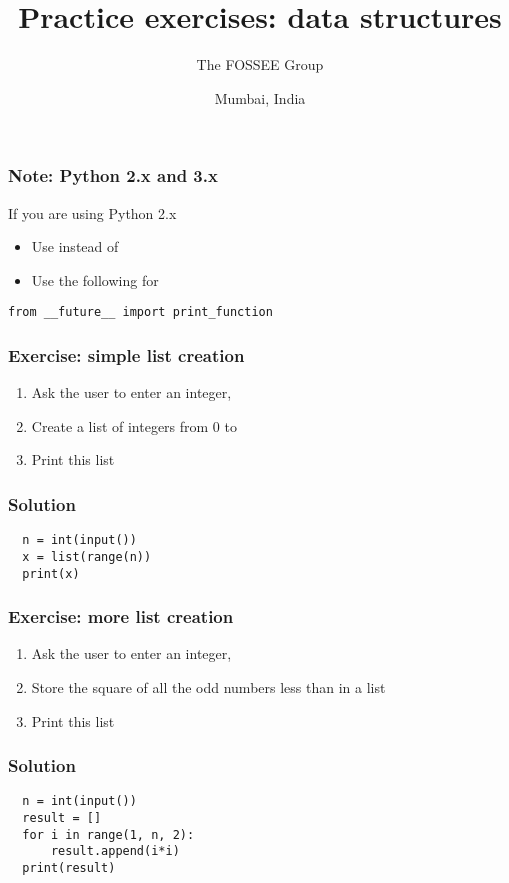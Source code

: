 \documentclass[14pt,compress]{beamer}
\title[Basic Python]{Practice exercises: data structures}
\author[FOSSEE Team] {The FOSSEE Group}
\institute[FOSSEE -- IITB] {Department of Aerospace Engineering\\IIT Bombay}
\date[] {Mumbai, India}
\begin{document}
\begin{frame}
  \titlepage
\end{frame}

\begin{frame}
  \frametitle{Note: Python 2.x and 3.x}

 If you are using Python 2.x
  \begin{itemize}
  \item Use  instead of 
  \item Use the following for 
  \end{itemize}
 \begin{lstlisting}
from __future__ import print_function
\end{lstlisting}
\end{frame}

\begin{frame}[plain]
  \frametitle{Exercise: simple list creation}
  \begin{enumerate}
  \item Ask the user to enter an integer, 
  \item Create a list of integers from 0 to 
  \item Print this list
  \end{enumerate}
\end{frame}

\begin{frame}
\frametitle{Solution}
\begin{lstlisting}
  n = int(input())
  x = list(range(n))
  print(x)
\end{lstlisting}
\end{frame}

\begin{frame}[plain]
  \frametitle{Exercise: more list creation}
  \begin{enumerate}
  \item Ask the user to enter an integer, 
  \item Store the square of all the odd numbers less than  in a list
  \item Print this list
  \end{enumerate}
\end{frame}

\begin{frame}
\frametitle{Solution}
\begin{lstlisting}
  n = int(input())
  result = []
  for i in range(1, n, 2):
      result.append(i*i)
  print(result)
\end{lstlisting}
\end{frame}
\end{document}
